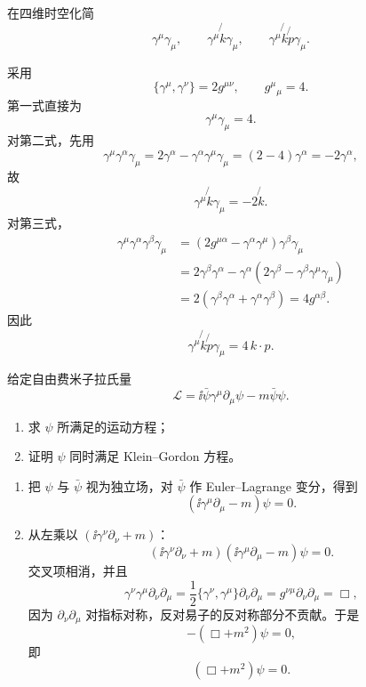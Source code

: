 
\begin{question}[10 分]
在四维时空化简
\[
\gamma^\mu\gamma_\mu,\qquad
\gamma^\mu\not{k}\gamma_\mu,\qquad
\gamma^\mu\not{k}\not{p}\gamma_\mu.
\]
\begin{solution}
采用
\[
\{\gamma^\mu,\gamma^\nu\}=2g^{\mu\nu},\qquad g^\mu{}_{\mu}=4.
\]
第一式直接为
\[
\boxed{\gamma^\mu\gamma_\mu=4}.
\]
对第二式，先用
\[
\gamma^\mu\gamma^\alpha\gamma_\mu
=2\gamma^\alpha-\gamma^\alpha\gamma^\mu\gamma_\mu
=(2-4)\gamma^\alpha=-2\gamma^\alpha,
\]
故
\[
\boxed{\gamma^\mu\not{k}\gamma_\mu=-2\not{k}}.
\]
对第三式，
\[
\begin{aligned}
\gamma^\mu\gamma^\alpha\gamma^\beta\gamma_\mu
&=(2g^{\mu\alpha}-\gamma^\alpha\gamma^\mu)\gamma^\beta\gamma_\mu\\
&=2\gamma^\beta\gamma^\alpha-
\gamma^\alpha(2\gamma^\beta-\gamma^\beta\gamma^\mu\gamma_\mu)\\
&=2(\gamma^\beta\gamma^\alpha+\gamma^\alpha\gamma^\beta)
=4g^{\alpha\beta}.
\end{aligned}
\]
因此
\[
\boxed{\gamma^\mu\not{k}\not{p}\gamma_\mu=4\,k\cdot p}.
\]
\end{solution}
\end{question}

\begin{question}[20 分]
给定自由费米子拉氏量
\[
\mathcal L=\ii\bar\psi\gamma^\mu\partial_\mu\psi-m\bar\psi\psi.
\]
\begin{enumerate}
  \item 求 $\psi$ 所满足的运动方程；
  \item 证明 $\psi$ 同时满足 Klein--Gordon 方程。
\end{enumerate}
\begin{solution}
\begin{enumerate}
  \item 把 $\psi$ 与 $\bar\psi$ 视为独立场，对 $\bar\psi$ 作 Euler--Lagrange 变分，得到
  \[
  \boxed{(\ii\gamma^\mu\partial_\mu-m)\psi=0}.
  \]

  \item 从左乘以 $(\ii\gamma^\nu\partial_\nu+m)$：
  \[
  (\ii\gamma^\nu\partial_\nu+m)(\ii\gamma^\mu\partial_\mu-m)\psi=0.
  \]
  交叉项相消，并且
  \[
  \gamma^\nu\gamma^\mu\partial_\nu\partial_\mu
  =\frac12\{\gamma^\nu,\gamma^\mu\}\partial_\nu\partial_\mu
  =g^{\nu\mu}\partial_\nu\partial_\mu=\Box,
  \]
  因为 $\partial_\nu\partial_\mu$ 对指标对称，反对易子的反对称部分不贡献。于是
  \[
  -(\Box+m^2)\psi=0,
  \]
  即
  \[
  \boxed{(\Box+m^2)\psi=0}.
  \]
\end{enumerate}
\end{solution}
\end{question}

